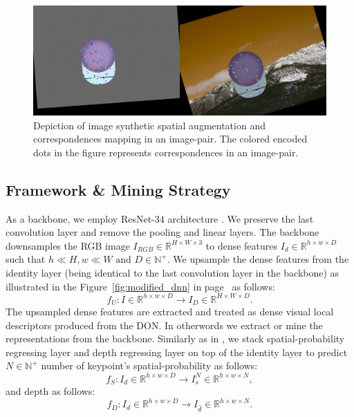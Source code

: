 \begin{figure}[htb]
    \centering
    \includegraphics[scale=0.175]{images/debug_correspondences.png}
    \caption{Depiction of image synthetic spatial augmentation and correspondences mapping in an image-pair. The colored encoded dots in the figure represents correspondences in an image-pair.}
    \label{fig:image_augs}
\end{figure}


\subsection{Framework \& Mining Strategy}

As a backbone, we employ ResNet-34 architecture \cite{resnet}.
We preserve the last convolution layer and remove the pooling and linear layers. The backbone downsamples the RGB image $I_{RGB} \in \mathbb{R}^{H \times W \times 3}$
to dense features $I_d \in \mathbb{R}^{h \times w \times D}$
such that $ h \ll H, w \ll W \text{ and } D \in \mathbb{N}^+$.
We upsample the dense features from the identity layer
(being identical to the last convolution layer in the backbone) as illustrated in the Figure~\ref{fig:modified_dnn} in page~\pageref{fig:modified_dnn} as follows:
\begin{equation}
    f_U: I \in \mathbb{R}^{h \times w \times D} \rightarrow I_D \in \mathbb{R}^{H \times W \times D}.
\end{equation}
The upsampled dense features are extracted and treated as dense visual local descriptors produced from the DON. In otherwords
we extract or mine the representations from the backbone.
Similarly as in \cite{suwajanakorn2018discovery}, we stack spatial-probability regressing layer and
depth regressing layer on top of the identity layer to predict $N \in \mathbb{N}^+$ number of keypoint's spatial-probability as follows:
\begin{equation}
    f_S: I_d \in \mathbb{R}^{h \times w \times D} \rightarrow I_s^N \in \mathbb{R}^{h \times w \times N},
\end{equation}
and depth as follows:
\begin{equation}
    f_D: I_d \in \mathbb{R}^{h \times w \times D} \rightarrow I_{\hat{d}} \in \mathbb{R}^{h \times w \times N}.
\end{equation}


